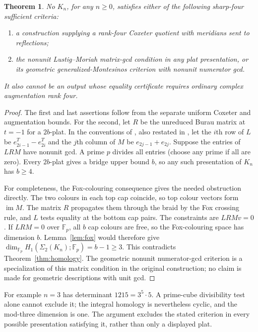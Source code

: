 \documentclass[11pt]{article}
\newtheorem{theorem}{Theorem}
\newcommand{\F}{\mathbb F}
\newcommand{\Sig}{\Sigma_2}
\begin{document}
\begin{theorem}\label{thm:criteria}
No $K_n$, for any $n\ge0$, satisfies either of the following
sharp-four sufficient criteria:
\begin{enumerate}
\item a construction supplying a rank-four Coxeter quotient with
meridians sent to reflections;
\item the nonunit Lustig--Moriah matrix-gcd condition in any plat presentation,
or its geometric generalized-Montesinos criterion with nonunit
numerator gcd.
\end{enumerate}
It also cannot be an output whose equality certificate requires
ordinary complex augmentation rank four.
\end{theorem}
\begin{proof}
The first and last assertions follow from the separate uniform
Coxeter and augmentation bounds. For the second, let $R$ be the
unreduced Burau matrix at $t=-1$ for a $2b$-plat. In the conventions
of \cite[Proposition~5.6, pp.~186--187]{lustig}, also restated in
\cite[Theorem~4.20]{moriah}, let the $i$th row of $L$ be
$e_{2i-1}^{T}-e_{2i}^{T}$ and the $j$th column of $M$ be
$e_{2j-1}+e_{2j}$. Suppose the entries of $LRM$ have nonunit gcd.
A prime $p$ divides all entries (choose any prime if all are zero).
Every $2b$-plat gives a bridge upper bound $b$, so any such
presentation of $K_n$ has $b\ge4$.

For completeness, the Fox-colouring consequence gives the needed
obstruction directly. The two colours in each top cap coincide,
so top colour vectors form $\operatorname{im}M$. The matrix $R$
propagates them through the braid by the Fox crossing rule, and
$L$ tests equality at the bottom cap pairs. The constraints are
$LRM v=0$.
If $LRM=0$ over $\F_p$, all $b$ cap colours are free, so the
Fox-colouring space has dimension $b$. Lemma~\ref{lem:fox} would therefore give
$\dim_{\F_p}H_1(\Sig(K_n);\F_p)=b-1\ge3$. This contradicts Theorem~\ref{thm:homology}.
The geometric nonunit numerator-gcd criterion is a specialization
of this matrix condition in the original construction; no claim
is made for geometric descriptions with unit gcd.
\end{proof}

For example $n=3$ has determinant $1215=3^5\cdot5$.
A prime-cube divisibility test alone cannot exclude it; the integral
homology is nevertheless cyclic, and the mod-three dimension is one.
The argument excludes the stated criterion in every possible
presentation satisfying it, rather than only a displayed plat.
\end{document}
